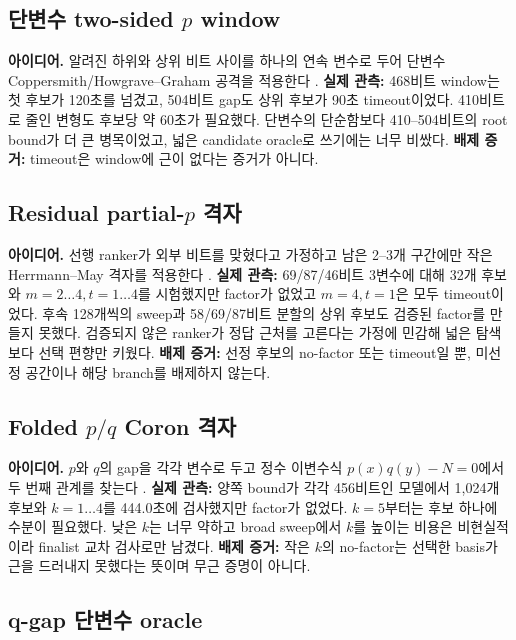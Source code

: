 \documentclass[10pt,a4paper]{article}
\newcommand{\evidence}[1]{\textbf{배제 증거:} #1}
\newcommand{\observed}[1]{\textbf{실제 관측:} #1}
\begin{document}
\subsection{단변수 two-sided \texorpdfstring{\(p\)}{p} window}

\textbf{아이디어.} 알려진 하위와 상위 비트 사이를 하나의 연속 변수로
두어 단변수 Coppersmith/Howgrave--Graham 공격을 적용한다
\cite{coppersmith,howgrave-graham}.
\observed{468비트 window는 첫 후보가 120초를 넘겼고, 504비트 gap도
상위 후보가 90초 timeout이었다. 410비트로 줄인 변형도 후보당 약
60초가 필요했다.}
단변수의 단순함보다 410--504비트의 root bound가 더 큰 병목이었고,
넓은 candidate oracle로 쓰기에는 너무 비쌌다.
\evidence{timeout은 window에 근이 없다는 증거가 아니다.}

\subsection{Residual partial-\texorpdfstring{\(p\)}{p} 격자}

\textbf{아이디어.} 선행 ranker가 외부 비트를 맞혔다고 가정하고 남은
2--3개 구간에만 작은 Herrmann--May 격자를 적용한다
\cite{herrmann-may}.
\observed{69/87/46비트 3변수에 대해 32개 후보와
\(m=2\ldots4,t=1\ldots4\)를 시험했지만 factor가 없었고
\(m=4,t=1\)은 모두 timeout이었다. 후속 128개씩의 sweep과
58/69/87비트 분할의 상위 후보도 검증된 factor를 만들지 못했다.}
검증되지 않은 ranker가 정답 근처를 고른다는 가정에 민감해 넓은 탐색보다
선택 편향만 키웠다.
\evidence{선정 후보의 no-factor 또는 timeout일 뿐, 미선정 공간이나
해당 branch를 배제하지 않는다.}

\subsection{Folded \texorpdfstring{\(p/q\)}{p/q} Coron 격자}

\textbf{아이디어.} \(p\)와 \(q\)의 gap을 각각 변수로 두고 정수
이변수식 \(p(x)q(y)-N=0\)에서 두 번째 관계를 찾는다
\cite{coron}.
\observed{양쪽 bound가 각각 456비트인 모델에서 1,024개 후보와
\(k=1\ldots4\)를 444.0초에 검사했지만 factor가 없었다.
\(k=5\)부터는 후보 하나에 수분이 필요했다.}
낮은 \(k\)는 너무 약하고 broad sweep에서 \(k\)를 높이는 비용은
비현실적이라 finalist 교차 검사로만 남겼다.
\evidence{작은 \(k\)의 no-factor는 선택한 basis가 근을 드러내지
못했다는 뜻이며 무근 증명이 아니다.}

\subsection{q-gap 단변수 oracle}
\end{document}
